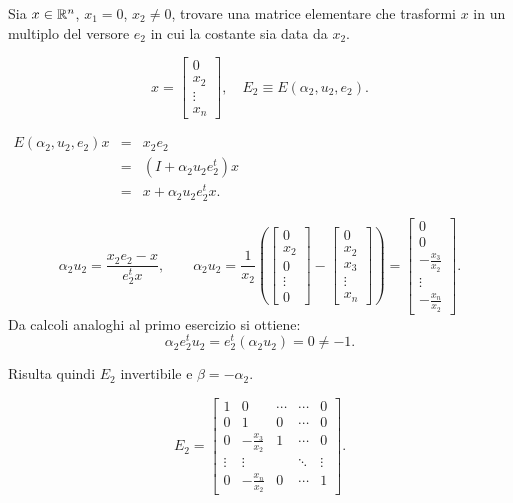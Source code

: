 \begin{ese}\label{ese2}
Sia $x \in \mathbb{R}^n$, $x_1 = 0$, $x_2 \neq 0$, trovare una matrice elementare che
trasformi $x$ in un multiplo del versore $e_2$ in cui la costante sia data da
$x_2$.

\[
x = \left[\begin{array}{c}0 \\ x_2 \\ \vdots \\ x_n\end{array}\right],
\quad E_2 \equiv E(\alpha_2, u_2, e_2).\]

$
\begin{array}{ccl}
E(\alpha_2, u_2, e_2)x & = & x_2e_2 \\
& = & (I + \alpha_2u_2e_2^t)x \\
& = & x + \alpha_2u_2e_2^tx.
\end{array}$

\[
\alpha_2u_2 = \frac{x_2e_2 - x}{e_2^tx}, \qquad
\alpha_2u_2 =
\frac{1}{x_2}\left(\left[\begin{array}{c}0\\x_2\\0\\ \vdots \\ 0 \end{array}
\right] - \left[\begin{array}{c}0\\x_2\\x_3\\ \vdots \\ x_n \end{array}
\right] \right)
= \left[
\begin{array}{c}
0 \\
0 \\
-\frac{x_3}{x_2} \\
\vdots \\
-\frac{x_n}{x_2}
\end{array}\right].
\]
Da calcoli analoghi al primo esercizio si ottiene:
\[\alpha_2e_2^tu_2 = e_2^t(\alpha_2u_2) = 0 \neq -1.\]

Risulta quindi $E_2$ invertibile e $\beta = - \alpha_2$.

\[
E_2 =
\left[\begin{array}{ccccc}
1 & 0 &\cdots  &\cdots & 0 \\
0  & 1 & 0  & \cdots & 0 \\
0 &-\frac{x_3}{x_2} & 1  & \cdots & 0 \\
\vdots & \vdots  & &\ddots & \vdots\\
0 &-\frac{x_n}{x_2}  & 0 &\cdots &1
\end{array}\right].
\]


\end{ese}
